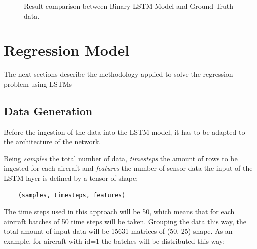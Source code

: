 \begin{figure}[H]
\begin{center}
\end{center}
\decoRule
\caption[Result comparison between Binary LSTM Model and Ground Truth data]{Result comparison between Binary LSTM Model and Ground Truth data.}
\label{fig:binary-lstm-results}
\end{figure}


\section{Regression Model}

The next sections describe the methodology applied to solve the regression problem using LSTMs


\subsection{Data Generation}

Before the ingestion of the data into the LSTM model, it has to be adapted to the architecture of the network.

Being \textit{samples} the total number of data, \textit{timesteps} the amount of rows to be ingested for each aircraft and \textit{features} the number of sensor data the input of the LSTM layer is defined by a tensor of shape:

\begin{verbatim}
    (samples, timesteps, features)
\end{verbatim}

The time steps used in this approach will be 50, which means that for each aircraft batches of 50 time steps will be taken.
Grouping the data this way, the total amount of input data will be 15631 matrices of (50, 25) shape.
As an example, for aircraft with id=1 the batches will be distributed this way:

